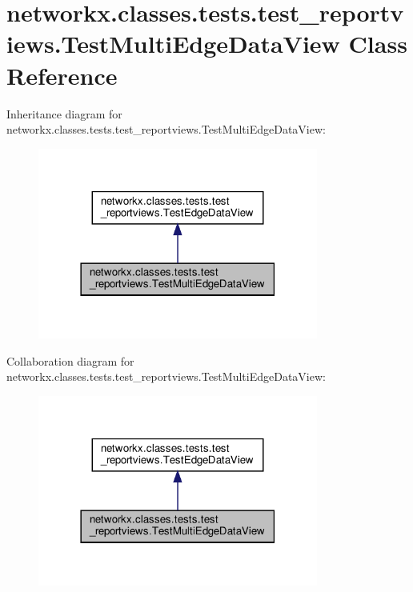 \hypertarget{classnetworkx_1_1classes_1_1tests_1_1test__reportviews_1_1TestMultiEdgeDataView}{}\section{networkx.\+classes.\+tests.\+test\+\_\+reportviews.\+Test\+Multi\+Edge\+Data\+View Class Reference}
\label{classnetworkx_1_1classes_1_1tests_1_1test__reportviews_1_1TestMultiEdgeDataView}


Inheritance diagram for networkx.\+classes.\+tests.\+test\+\_\+reportviews.\+Test\+Multi\+Edge\+Data\+View\+:
\nopagebreak
\begin{figure}[H]
\begin{center}
\leavevmode
\includegraphics[width=261pt]{classnetworkx_1_1classes_1_1tests_1_1test__reportviews_1_1TestMultiEdgeDataView__inherit__graph}
\end{center}
\end{figure}


Collaboration diagram for networkx.\+classes.\+tests.\+test\+\_\+reportviews.\+Test\+Multi\+Edge\+Data\+View\+:
\nopagebreak
\begin{figure}[H]
\begin{center}
\leavevmode
\includegraphics[width=261pt]{classnetworkx_1_1classes_1_1tests_1_1test__reportviews_1_1TestMultiEdgeDataView__coll__graph}
\end{center}
\end{figure}
